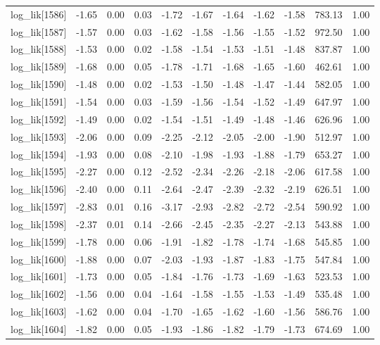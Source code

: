 \begin{table}[ht]
\begin{tabular}{rrrrrrrrrrr}
  log\_lik[1586] & -1.65 & 0.00 & 0.03 & -1.72 & -1.67 & -1.64 & -1.62 & -1.58 & 783.13 & 1.00 \\ 
  log\_lik[1587] & -1.57 & 0.00 & 0.03 & -1.62 & -1.58 & -1.56 & -1.55 & -1.52 & 972.50 & 1.00 \\ 
  log\_lik[1588] & -1.53 & 0.00 & 0.02 & -1.58 & -1.54 & -1.53 & -1.51 & -1.48 & 837.87 & 1.00 \\ 
  log\_lik[1589] & -1.68 & 0.00 & 0.05 & -1.78 & -1.71 & -1.68 & -1.65 & -1.60 & 462.61 & 1.00 \\ 
  log\_lik[1590] & -1.48 & 0.00 & 0.02 & -1.53 & -1.50 & -1.48 & -1.47 & -1.44 & 582.05 & 1.00 \\ 
  log\_lik[1591] & -1.54 & 0.00 & 0.03 & -1.59 & -1.56 & -1.54 & -1.52 & -1.49 & 647.97 & 1.00 \\ 
  log\_lik[1592] & -1.49 & 0.00 & 0.02 & -1.54 & -1.51 & -1.49 & -1.48 & -1.46 & 626.96 & 1.00 \\ 
  log\_lik[1593] & -2.06 & 0.00 & 0.09 & -2.25 & -2.12 & -2.05 & -2.00 & -1.90 & 512.97 & 1.00 \\ 
  log\_lik[1594] & -1.93 & 0.00 & 0.08 & -2.10 & -1.98 & -1.93 & -1.88 & -1.79 & 653.27 & 1.00 \\ 
  log\_lik[1595] & -2.27 & 0.00 & 0.12 & -2.52 & -2.34 & -2.26 & -2.18 & -2.06 & 617.58 & 1.00 \\ 
  log\_lik[1596] & -2.40 & 0.00 & 0.11 & -2.64 & -2.47 & -2.39 & -2.32 & -2.19 & 626.51 & 1.00 \\ 
  log\_lik[1597] & -2.83 & 0.01 & 0.16 & -3.17 & -2.93 & -2.82 & -2.72 & -2.54 & 590.92 & 1.00 \\ 
  log\_lik[1598] & -2.37 & 0.01 & 0.14 & -2.66 & -2.45 & -2.35 & -2.27 & -2.13 & 543.88 & 1.00 \\ 
  log\_lik[1599] & -1.78 & 0.00 & 0.06 & -1.91 & -1.82 & -1.78 & -1.74 & -1.68 & 545.85 & 1.00 \\ 
  log\_lik[1600] & -1.88 & 0.00 & 0.07 & -2.03 & -1.93 & -1.87 & -1.83 & -1.75 & 547.84 & 1.00 \\ 
  log\_lik[1601] & -1.73 & 0.00 & 0.05 & -1.84 & -1.76 & -1.73 & -1.69 & -1.63 & 523.53 & 1.00 \\ 
  log\_lik[1602] & -1.56 & 0.00 & 0.04 & -1.64 & -1.58 & -1.55 & -1.53 & -1.49 & 535.48 & 1.00 \\ 
  log\_lik[1603] & -1.62 & 0.00 & 0.04 & -1.70 & -1.65 & -1.62 & -1.60 & -1.56 & 586.76 & 1.00 \\ 
  log\_lik[1604] & -1.82 & 0.00 & 0.05 & -1.93 & -1.86 & -1.82 & -1.79 & -1.73 & 674.69 & 1.00 \\ 

\end{tabular}
\end{table}
